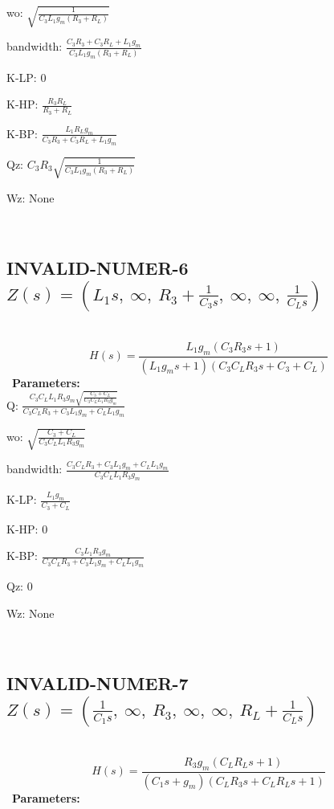 \documentclass{article}
\begin{document}
wo: $\sqrt{\frac{1}{C_{3} L_{1} g_{m} \left(R_{3} + R_{L}\right)}}$\ 

bandwidth: $\frac{C_{3} R_{3} + C_{3} R_{L} + L_{1} g_{m}}{C_{3} L_{1} g_{m} \left(R_{3} + R_{L}\right)}$\ 

K-LP: $0$\ 

K-HP: $\frac{R_{3} R_{L}}{R_{3} + R_{L}}$\ 

K-BP: $\frac{L_{1} R_{L} g_{m}}{C_{3} R_{3} + C_{3} R_{L} + L_{1} g_{m}}$\ 

Qz: $C_{3} R_{3} \sqrt{\frac{1}{C_{3} L_{1} g_{m} \left(R_{3} + R_{L}\right)}}$\ 

Wz: $\text{None}$\ 

\ 

\subsection{INVALID-NUMER-6 $Z(s) = \left( L_{1} s, \  \infty, \  R_{3} + \frac{1}{C_{3} s}, \  \infty, \  \infty, \  \frac{1}{C_{L} s}\right)$ } \ 
\textbf{\[H(s) = \frac{L_{1} g_{m} \left(C_{3} R_{3} s + 1\right)}{\left(L_{1} g_{m} s + 1\right) \left(C_{3} C_{L} R_{3} s + C_{3} + C_{L}\right)}\] } \ 
\textbf{Parameters:}\\ 

Q: $\frac{C_{3} C_{L} L_{1} R_{3} g_{m} \sqrt{\frac{C_{3} + C_{L}}{C_{3} C_{L} L_{1} R_{3} g_{m}}}}{C_{3} C_{L} R_{3} + C_{3} L_{1} g_{m} + C_{L} L_{1} g_{m}}$\ 

wo: $\sqrt{\frac{C_{3} + C_{L}}{C_{3} C_{L} L_{1} R_{3} g_{m}}}$\ 

bandwidth: $\frac{C_{3} C_{L} R_{3} + C_{3} L_{1} g_{m} + C_{L} L_{1} g_{m}}{C_{3} C_{L} L_{1} R_{3} g_{m}}$\ 

K-LP: $\frac{L_{1} g_{m}}{C_{3} + C_{L}}$\ 

K-HP: $0$\ 

K-BP: $\frac{C_{3} L_{1} R_{3} g_{m}}{C_{3} C_{L} R_{3} + C_{3} L_{1} g_{m} + C_{L} L_{1} g_{m}}$\ 

Qz: $0$\ 

Wz: $\text{None}$\ 

\ 

\subsection{INVALID-NUMER-7 $Z(s) = \left( \frac{1}{C_{1} s}, \  \infty, \  R_{3}, \  \infty, \  \infty, \  R_{L} + \frac{1}{C_{L} s}\right)$ } \ 
\textbf{\[H(s) = \frac{R_{3} g_{m} \left(C_{L} R_{L} s + 1\right)}{\left(C_{1} s + g_{m}\right) \left(C_{L} R_{3} s + C_{L} R_{L} s + 1\right)}\] } \ 
\textbf{Parameters:}\\ 
\end{document}
